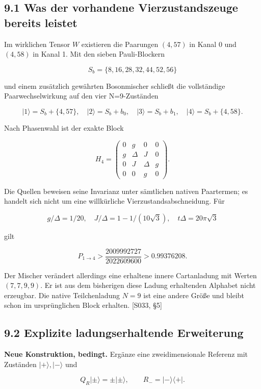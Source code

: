 \subsection{9.1 Was der vorhandene Vierzustandszeuge bereits
leistet}\label{was-der-vorhandene-vierzustandszeuge-bereits-leistet}

Im wirklichen Tensor \(W\) existieren die Paarungen \((4,57)\) in Kanal
0 und \((4,58)\) in Kanal 1. Mit den sieben Pauli-Blockern

\[S_b=\{8,16,28,32,44,52,56\}\]

und einem zusätzlich gewährten Bosonmischer schließt die vollständige
Paarwechselwirkung auf den vier N=9-Zuständen

\[
|1\rangle=S_b+\{4,57\},\quad |2\rangle=S_b+b_0,
\quad |3\rangle=S_b+b_1,\quad |4\rangle=S_b+\{4,58\}.
\]

Nach Phasenwahl ist der exakte Block

\[H_4=\begin{pmatrix}
0&g&0&0\\g&\Delta&J&0\\0&J&\Delta&g\\0&0&g&0
\end{pmatrix}.\]

Die Quellen beweisen seine Invarianz unter sämtlichen nativen
Paartermen; es handelt sich nicht um eine willkürliche
Vierzustandsabschneidung. Für

\[g/\Delta=1/20,\quad J/\Delta=1-1/(10\sqrt3),
\quad t\Delta=20\pi\sqrt3\]

gilt

\[P_{1\to4}>\frac{2009992727}{2022609600}>0.99376208.\]

Der Mischer verändert allerdings eine erhaltene innere Cartanladung mit
Werten \((7,7,9,9)\). Er ist aus dem bisherigen diese Ladung erhaltenden
Alphabet nicht erzeugbar. Die native Teilchenladung \(N=9\) ist eine
andere Größe und bleibt schon im ursprünglichen Block erhalten. {[}S033,
§5{]}

\subsection{9.2 Explizite ladungserhaltende
Erweiterung}\label{explizite-ladungserhaltende-erweiterung}

\textbf{Neue Konstruktion, bedingt.} Ergänze eine zweidimensionale
Referenz mit Zuständen \(|+\rangle,|-\rangle\) und

\[Q_R|\pm\rangle=\pm|\pm\rangle,\qquad
R_-=|-\rangle\langle+|.\]

